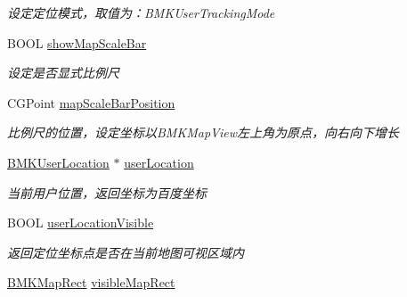 \begin{DoxyCompactItemize}
\begin{DoxyCompactList}\small\item\em 设定定位模式，取值为：\-B\-M\-K\-User\-Tracking\-Mode \end{DoxyCompactList}\item 
\hypertarget{interface_b_m_k_map_view_ad8768aef899c970e88a4cba6f4f7a1bd}{B\-O\-O\-L \hyperlink{interface_b_m_k_map_view_ad8768aef899c970e88a4cba6f4f7a1bd}{show\-Map\-Scale\-Bar}}\label{interface_b_m_k_map_view_ad8768aef899c970e88a4cba6f4f7a1bd}

\begin{DoxyCompactList}\small\item\em 设定是否显式比例尺 \end{DoxyCompactList}\item 
\hypertarget{interface_b_m_k_map_view_a5eeee2f88682636f7e6f891246b03730}{C\-G\-Point \hyperlink{interface_b_m_k_map_view_a5eeee2f88682636f7e6f891246b03730}{map\-Scale\-Bar\-Position}}\label{interface_b_m_k_map_view_a5eeee2f88682636f7e6f891246b03730}

\begin{DoxyCompactList}\small\item\em 比例尺的位置，设定坐标以\-B\-M\-K\-Map\-View左上角为原点，向右向下增长 \end{DoxyCompactList}\item 
\hypertarget{interface_b_m_k_map_view_a165690d8952edbf58fd33101d3d169e8}{\hyperlink{interface_b_m_k_user_location}{B\-M\-K\-User\-Location} $\ast$ \hyperlink{interface_b_m_k_map_view_a165690d8952edbf58fd33101d3d169e8}{user\-Location}}\label{interface_b_m_k_map_view_a165690d8952edbf58fd33101d3d169e8}

\begin{DoxyCompactList}\small\item\em 当前用户位置，返回坐标为百度坐标 \end{DoxyCompactList}\item 
\hypertarget{interface_b_m_k_map_view_a8e3facab242ecd1ea2aadea90c158b99}{B\-O\-O\-L \hyperlink{interface_b_m_k_map_view_a8e3facab242ecd1ea2aadea90c158b99}{user\-Location\-Visible}}\label{interface_b_m_k_map_view_a8e3facab242ecd1ea2aadea90c158b99}

\begin{DoxyCompactList}\small\item\em 返回定位坐标点是否在当前地图可视区域内 \end{DoxyCompactList}\item 
\hypertarget{interface_b_m_k_map_view_a35576ab39592ef50d1190c2b672c0923}{\hyperlink{struct_b_m_k_map_rect}{B\-M\-K\-Map\-Rect} \hyperlink{interface_b_m_k_map_view_a35576ab39592ef50d1190c2b672c0923}{visible\-Map\-Rect}}\label{interface_b_m_k_map_view_a35576ab39592ef50d1190c2b672c0923}


\end{DoxyCompactItemize}

